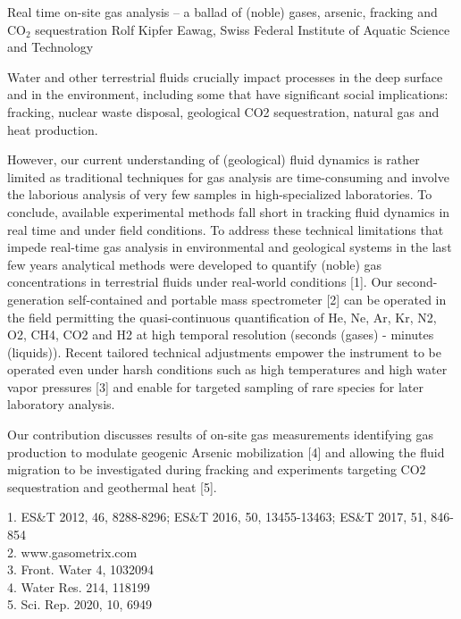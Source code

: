 \begin{conf-abstract}
{Real time on-site gas analysis -- a ballad of (noble) gases, arsenic, fracking and CO$_2$ sequestration}
{Rolf Kipfer}
{Eawag, Swiss Federal Institute of Aquatic Science and Technology}
{Water and other terrestrial fluids crucially impact processes in the deep surface and in the environment, including some that have significant social implications: fracking, nuclear waste disposal, geological CO2 sequestration, natural gas and heat production.

However, our current understanding of (geological) fluid dynamics is rather limited as traditional techniques for gas analysis are time-consuming and involve the laborious analysis of very few samples in high-specialized laboratories. To conclude, available experimental methods fall short in tracking fluid dynamics in real time and under field conditions.
To address these technical limitations that impede real-time gas analysis in environmental and geological systems in the last few years analytical methods were developed to quantify (noble) gas concentrations in terrestrial fluids under real-world conditions [1]. Our second-generation self-contained and portable mass spectrometer [2] can be operated in the field permitting the quasi-continuous quantification of He, Ne, Ar, Kr, N2, O2, CH4, CO2 and H2 at high temporal resolution (seconds (gases) - minutes (liquids)). Recent tailored technical adjustments empower the instrument to be operated even under harsh conditions such as high temperatures and high water vapor pressures [3] and enable for targeted sampling of rare species for later laboratory analysis.

Our contribution discusses results of on-site gas measurements identifying gas production to modulate geogenic Arsenic mobilization [4] and allowing the fluid migration to be investigated during fracking and experiments targeting CO2 sequestration and geothermal heat [5].

1. ES\&T 2012, 46, 8288-8296; ES\&T 2016, 50, 13455-13463; ES\&T 2017, 51, 846-854\\
2. www.gasometrix.com\\
3. Front. Water 4, 1032094\\
4. Water Res. 214, 118199\\
5. Sci. Rep. 2020, 10, 6949}
\end{conf-abstract}
